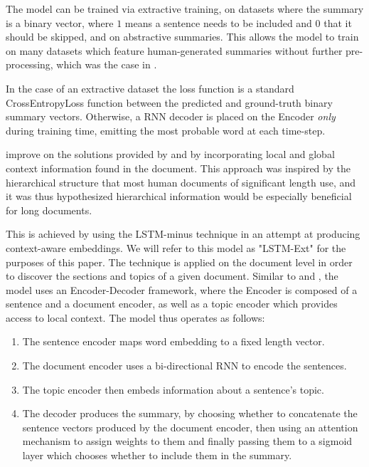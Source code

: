 \documentclass[preprint,review,12pt]{elsarticle}
\begin{document}
The model can be trained via extractive training, on datasets where the summary is a binary vector, where $1$ means a sentence needs to be included and $0$ that it should be skipped, and on abstractive summaries. This allows the model to train on many datasets which feature human-generated summaries without further pre-processing, which was the case in \citet{lapata}.

In the case of an extractive dataset the loss function is a standard CrossEntropyLoss function between the predicted and ground-truth binary summary vectors. Otherwise, a RNN decoder is placed on the Encoder \textit{only} during training time, emitting the most probable word at each time-step. 




\citet{xiao} improve on the solutions provided by \citet{lapata} and \citet{nallapati} by incorporating local and global context information found in the document. This approach was inspired by the hierarchical structure that most human documents of significant length use, and it was thus hypothesized hierarchical information would be especially beneficial for long documents. 

This is achieved by using the LSTM-minus technique\cite{wang} in an attempt at producing context-aware embeddings. We will refer to this model as "LSTM-Ext" for the purposes of this paper. The technique is applied on the document level in order to discover the sections and topics of a given document. Similar to \citet{lapata} and \citet{nallapati}, the model uses an Encoder-Decoder framework, where the Encoder is composed of a sentence and a document encoder, as well as a topic encoder which provides access to local context. The model thus operates as follows:

\begin{enumerate}
    \item The sentence encoder maps word embedding to a fixed length vector. 
    \item  The document encoder uses a bi-directional RNN to encode the sentences.
    \item The topic encoder then embeds information about a sentence's topic.
    \item  The decoder produces the summary, by choosing whether to concatenate the sentence vectors produced by the document encoder, then using an attention mechanism to assign weights to them and finally passing them to a sigmoid layer which chooses whether to include them in the summary.
\end{enumerate}
\end{document}
